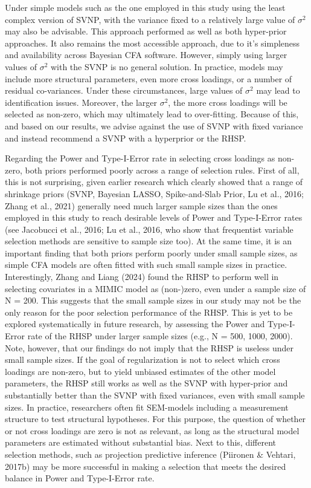 \documentclass[
  man, donotrepeattitle,floatsintext]{apa6}
\begin{document}
Under simple models such as the one employed in this study
using the least complex version of SVNP, with the variance fixed to a relatively large value of \(\sigma^2\) may also be advisable. This approach performed as well as both hyper-prior approaches. It also remains the most accessible approach, due to it's simpleness and availability across Bayesian CFA software. However, simply using larger values of \(\sigma^2\) with the SVNP is no general solution. In practice, models may include more structural
parameters, even more cross loadings, or a number of residual
co-variances. Under these circumstances, large values of \(\sigma^2\) may
lead to identification issues. Moreover, the larger \(\sigma^2\), the more
cross loadings will be selected as non-zero, which may ultimately lead
to over-fitting. Because of this, and based on our results, we advise against the use of SVNP with fixed variance and instead recommend a SVNP with a hyperprior or the RHSP.

Regarding the Power and Type-I-Error rate in selecting cross loadings as
non-zero, both priors performed poorly across a range of selection
rules. First of all, this is not surprising, given earlier research
which clearly showed that a range of shrinkage priors (SVNP, Bayesian
LASSO, Spike-and-Slab Prior, Lu et al., 2016; Zhang et al., 2021)
generally need much larger sample sizes than the ones employed in this
study to reach desirable levels of Power and Type-I-Error rates (see Jacobucci et al., 2016; Lu et al., 2016, who show that
frequentist variable selection methods are sensitive to sample size
too). At the same time, it is an important finding that both priors
perform poorly under small sample sizes, as simple CFA models are often
fitted with such small sample sizes in practice. Interestingly,
Zhang and Liang (2024) found the RHSP to perform well in selecting
covariates in a MIMIC model as (non-)zero, even under a sample size of N
= 200. This suggests that the small sample sizes in our study may not be
the only reason for the poor selection performance of the RHSP. This is
yet to be explored systematically in future research, by assessing the
Power and Type-I-Error rate of the RHSP under larger sample sizes (e.g.,
N = 500, 1000, 2000). Note, however, that our findings do not imply that
the RHSP is useless under small sample sizes. If the goal of
regularization is not to select which cross loadings are non-zero, but
to yield unbiased estimates of the other model parameters, the RHSP
still works as well as the SVNP with hyper-prior and substantially better than the SVNP with fixed variances, even with small
sample sizes. In practice, researchers often fit SEM-models including a
measurement structure to test structural hypotheses. For this purpose,
the question of whether or not cross loadings are zero is not as
relevant, as long as the structural model parameters are estimated
without substantial bias. Next to this, different selection methods,
such as projection predictive inference
(Piironen \& Vehtari, 2017b) may be more successful in making a selection
that meets the desired balance in Power and Type-I-Error rate.
\end{document}
